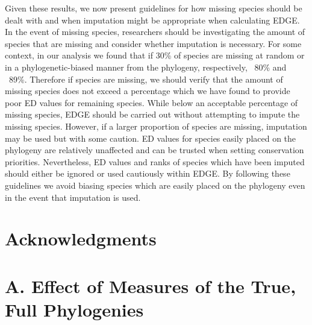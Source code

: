\documentclass[12pt,english]{article}
\begin{document}
Given these results, we now present guidelines for how missing species should be
dealt with and when imputation might be appropriate when calculating EDGE. In
the event of missing species, researchers should be investigating the amount of
species that are missing and consider whether imputation is necessary. For some
context, in our analysis we found that if 30\% of species are missing at random
or in a phylogenetic-biased manner from the phylogeny, respectively, ~80\% and
~89\%. Therefore if species are missing, we should verify that the amount of
missing species does not exceed a percentage which we have found to provide poor
ED values for remaining species. While below an acceptable percentage of missing
species, EDGE should be carried out without attempting to impute the missing
species.
However, if a larger proportion of species are missing, imputation may
be used but with some caution. ED values for species easily placed on
the phylogeny are relatively unaffected and can be trusted when
setting conservation priorities. Nevertheless, ED values and ranks of
species which have been imputed should either be ignored or used
cautiously within EDGE.
By following these guidelines we avoid biasing species which are
easily placed on the phylogeny even in the event that imputation is
used.

\section*{Acknowledgments}

\clearpage
\printbibliography

\clearpage
\appendix
\section*{A. Effect of Measures of the True, Full Phylogenies}
\end{document}
